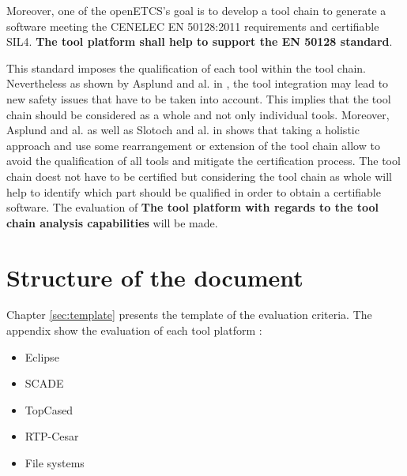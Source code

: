 Moreover, one of the openETCS's goal is to develop a tool chain to
generate a software meeting the CENELEC EN 50128:2011 requirements and
certifiable \gls{SIL}4. {\bf The tool platform shall help to support the EN 50128
standard}. 

This standard imposes the qualification of each tool within the tool
chain.  Nevertheless as shown by Asplund and al. in
\cite{asplund_qualifying_2012}, the tool integration may lead to new
safety issues that have to be taken into account. This implies that
the tool chain should be considered as a whole and not only individual
tools.  Moreover, Asplund and al. as well as Slotoch and al. in
\cite{slotosch_iso_2012} shows that taking a holistic approach and use
some rearrangement or extension of the tool chain allow to avoid the
qualification of all tools and mitigate the certification process.
The tool chain doest not have to be certified but considering the tool
chain as whole will help to identify which part should be qualified in
order to obtain a certifiable software.  The evaluation of {\bf The
  tool platform with regards to the tool chain analysis capabilities}
will be made.

\printglossary

\section{Structure of the document}

Chapter \ref{sec:template} presents the template of the evaluation
criteria.
The appendix show the evaluation of each tool platform :
\begin{itemize}
\item Eclipse
\item SCADE
\item TopCased
\item RTP-Cesar
\item File systems
\end{itemize}



